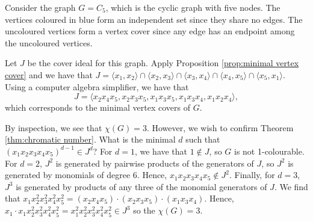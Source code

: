 \documentclass[../main.tex]{subfiles}
\begin{document}
    \begin{example}
        Consider the graph $G=C_5$, which is the cyclic graph with five nodes. The vertices coloured in blue form an independent set since they share no edges. The uncoloured vertices form a vertex cover since any edge has an endpoint among the uncoloured vertices.
        
        \begin{figure}[H]
            \centering
        \end{figure}

        Let $J$ be the cover ideal for this graph. Apply Proposition \ref{prop:minimal vertex cover} and we have that $J = \langle x_1,x_2\rangle \cap \langle x_2,x_3\rangle \cap \langle x_3,x_4\rangle \cap \langle x_4,x_5\rangle \cap \langle x_5,x_1\rangle$. Using a computer algebra simplifier, we have that $$J = \langle x_2x_4x_5, x_2x_3x_5, x_1x_3x_5, x_1x_3x_4,x_1x_2x_4\rangle,$$
        which corresponds to the minimal vertex covers of $G$.

        By inspection, we see that $\chi(G)=3$. However, we wish to confirm Theorem \ref{thm:chromatic number}. What is the minimal $d$ such that $(x_1x_2x_3x_4x_5)^{d-1}\in J^d$? For $d=1$, we have that $1\notin J$, so $G$ is not 1-colourable. For $d=2$, $J^2$ is generated by pairwise products of the generators of $J$, so $J^2$ is generated by monomials of degree 6. Hence, $x_1x_2x_3x_4x_5\notin J^2$. Finally, for $d=3$, $J^3$ is generated by products of any three of the monomial generators of $J$. We find that $x_1x_2^2x_3^2x_4^2x_5^2=(x_2x_4x_5)\cdot(x_2x_3x_5)\cdot(x_1x_3x_4)$. Hence, $x_1\cdot x_1x_2^2x_3^2x_4^2x_5^2 = x_1^2x_2^2x_3^2x_4^2x_5^2\in J^3$ so the $\chi(G)=3$.
    \end{example}
\end{document}
